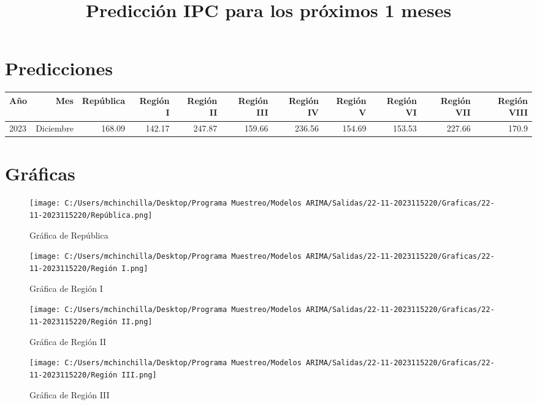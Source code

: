 \documentclass{article}%
\title{Predicción IPC para los próximos 1 meses}%
\date{}%
\begin{document}
%
\normalsize%
\maketitle%
\section{Predicciones}%
\label{sec:Predicciones}%
\begin{longtable}{|l r|r|r|r|r|r|r|r|r|r|}%
\hline%
Año&Mes&República&Región I&Región II&Región III&Región IV&Región V&Región VI&Región VII&Región VIII\\%
\hline%
2023&Diciembre&168.09&142.17&247.87&159.66&236.56&154.69&153.53&227.66&170.9\\%
\hline%
\end{longtable}

%
\section{Gráficas}%
\label{sec:Grficas}%


\begin{figure}[H]%
\centering%
\texttt{[image: C:/Users/mchinchilla/Desktop/Programa Muestreo/Modelos ARIMA/Salidas/22-11-2023115220/Graficas/22-11-2023115220/República.png]}%
\caption{Gráfica de República}%
\end{figure}

%


\begin{figure}[H]%
\centering%
\texttt{[image: C:/Users/mchinchilla/Desktop/Programa Muestreo/Modelos ARIMA/Salidas/22-11-2023115220/Graficas/22-11-2023115220/Región I.png]}%
\caption{Gráfica de Región I}%
\end{figure}

%


\begin{figure}[H]%
\centering%
\texttt{[image: C:/Users/mchinchilla/Desktop/Programa Muestreo/Modelos ARIMA/Salidas/22-11-2023115220/Graficas/22-11-2023115220/Región II.png]}%
\caption{Gráfica de Región II}%
\end{figure}

%


\begin{figure}[H]%
\centering%
\texttt{[image: C:/Users/mchinchilla/Desktop/Programa Muestreo/Modelos ARIMA/Salidas/22-11-2023115220/Graficas/22-11-2023115220/Región III.png]}%
\caption{Gráfica de Región III}%
\end{figure}
\end{document}
